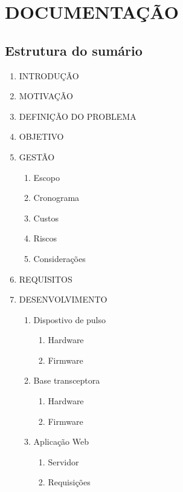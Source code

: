 \documentclass[a4paper]{article}
\begin{document}
\section{DOCUMENTAÇÃO}

\subsection{Estrutura do sumário}

\begin{enumerate}[label*=\arabic*.]

  	\item INTRODUÇÃO
    
    \item MOTIVAÇÃO
    
    \item DEFINIÇÃO DO PROBLEMA

	\item OBJETIVO
	
  	\item GESTÃO
	\begin{enumerate}[label*=\arabic*.]
		\item Escopo
		\item Cronograma
		\item Custos
		\item Riscos
		\item Considerações
	\end{enumerate} 
    
    \item REQUISITOS

	\item DESENVOLVIMENTO
	\begin{enumerate}[label*=\arabic*.]
		\item Dispostivo de pulso
		\begin{enumerate}[label*=\arabic*.]
			\item Hardware
			\item Firmware
		\end{enumerate}
		\item Base transceptora
		\begin{enumerate}[label*=\arabic*.]
			\item Hardware
			\item Firmware
		\end{enumerate}
		\item Aplicação Web
		\begin{enumerate}[label*=\arabic*.]
			\item Servidor
			\item Requisições
		\end{enumerate}
	\end{enumerate}


\end{enumerate}
\end{document}

